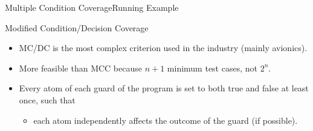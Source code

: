 \begin{Frame}{Multiple Condition Coverage}{Running Example}
\end{Frame}


\begin{Frame}{Modified Condition/Decision Coverage}
  \begin{itemize}
  	\item MC/DC is the most complex criterion used in the industry (mainly avionics).
  	\item More feasible than MCC because $n+1$ minimum test cases, not $2^n$.

    \item Every atom of each guard of the program is set to both true and false at least once, such that
    \begin{itemize}
      \item each atom independently affects the outcome of the guard (if possible).
    \end{itemize}
  \end{itemize}
	
  
\end{Frame}


